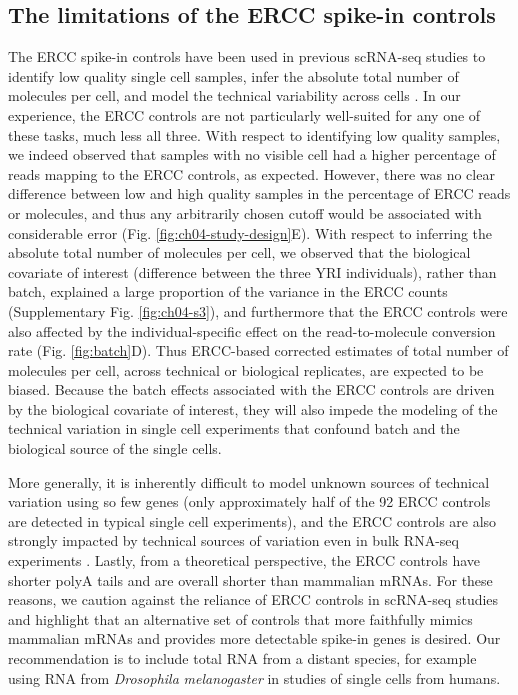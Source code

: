 \subsection{The limitations of the ERCC spike-in
controls}\label{the-limitations-of-the-ercc-spike-in-controls}

The ERCC spike-in controls have been used in previous scRNA-seq studies
to identify low quality single cell samples, infer the absolute total
number of molecules per cell, and model the technical variability across
cells \citep{Brennecke2013, Grun2014, Ding2015, Vallejos2015}. In our
experience, the ERCC controls are not particularly well-suited for any
one of these tasks, much less all three. With respect to identifying low
quality samples, we indeed observed that samples with no visible cell
had a higher percentage of reads mapping to the ERCC controls, as
expected. However, there was no clear difference between low and high
quality samples in the percentage of ERCC reads or molecules, and thus
any arbitrarily chosen cutoff would be associated with considerable
error (Fig. \ref{fig:ch04-study-design}E). With respect to inferring the absolute total number of
molecules per cell, we observed that the biological covariate of
interest (difference between the three YRI individuals), rather than
batch, explained a large proportion of the variance in the ERCC counts
(Supplementary Fig. \ref{fig:ch04-s3}), and furthermore that the ERCC controls were
also affected by the individual-specific effect on the read-to-molecule
conversion rate (Fig. \ref{fig:batch}D). Thus ERCC-based corrected estimates of total
number of molecules per cell, across technical or biological replicates,
are expected to be biased. Because the batch effects associated with the
ERCC controls are driven by the biological covariate of interest, they
will also impede the modeling of the technical variation in single cell
experiments that confound batch and the biological source of the single
cells.

More generally, it is inherently difficult to model unknown sources of
technical variation using so few genes \citep{Risso2014} (only
approximately half of the 92 ERCC controls are detected in typical
single cell experiments), and the ERCC controls are also strongly
impacted by technical sources of variation even in bulk RNA-seq
experiments \citep{SEQC/MAQC-IIIConsortium2014}. Lastly, from a
theoretical perspective, the ERCC controls have shorter polyA tails and
are overall shorter than mammalian mRNAs. For these reasons, we caution
against the reliance of ERCC controls in scRNA-seq studies and highlight
that an alternative set of controls that more faithfully mimics
mammalian mRNAs and provides more detectable spike-in genes is desired.
Our recommendation is to include total RNA from a distant species, for
example using RNA from \emph{Drosophila} \emph{melanogaster} in studies
of single cells from humans.

